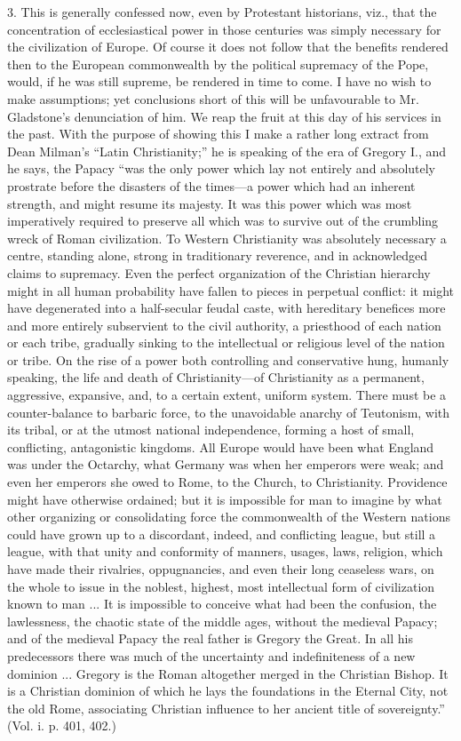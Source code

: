 3. This is generally confessed now, even by Protestant historians,
viz., that the concentration of ecclesiastical power in those centuries
was simply necessary for the civilization of Europe. Of course it does
not follow that the benefits rendered then to the European commonwealth
by the political supremacy of the Pope, would, if he was still supreme,
be rendered in time to come. I have no wish to make assumptions; yet
conclusions short of this will be unfavourable to Mr. Gladstone's
denunciation of him. We reap the fruit at this day of his services in
the past. With the purpose of showing this I make a rather long extract
from Dean Milman's ``Latin Christianity;'' he is speaking of the
era of Gregory I., and he says, the Papacy ``was the only power
which lay not entirely and absolutely prostrate before the disasters of
the times—a power which had an inherent strength, and might resume its
majesty. It was this power which was most imperatively required to
preserve all which was to survive out of the crumbling wreck of Roman
civilization. To Western Christianity was absolutely necessary a centre,
standing alone, strong in traditionary reverence, and in acknowledged
claims to supremacy. Even the perfect organization of the Christian
hierarchy might in all human probability have fallen to pieces in
perpetual conflict: it might have degenerated into a half-secular feudal
caste, with hereditary benefices more and more entirely subservient to
the civil authority, a priesthood of each nation or each tribe,
gradually sinking to the intellectual or religious level of the nation
or tribe. On the rise of a power both controlling and conservative hung,
humanly speaking, the life and death of Christianity—of Christianity
as a permanent, aggressive, expansive, and, to a certain extent, uniform
system. There must be a counter-balance to barbaric force, to the
unavoidable anarchy of Teutonism, with its tribal, or at the utmost
national independence, forming a host of small, conflicting,
antagonistic kingdoms. All Europe would have been what England was under
the Octarchy, what Germany was when her emperors were weak; and even her
emperors she owed to Rome, to the Church, to Christianity. Providence
might have otherwise ordained; but it is impossible for man to imagine
by what other organizing or consolidating force the commonwealth of the
Western nations could have grown up to a discordant, indeed, and
conflicting league, but still a league, with that unity and conformity
of manners, usages, laws, religion, which have made their rivalries,
oppugnancies, and even their long ceaseless wars, on the whole to
issue in the noblest, highest, most intellectual form of civilization
known to man ... It is impossible to conceive what had been the
confusion, the lawlessness, the chaotic state of the middle ages,
without the medieval Papacy; and of the medieval Papacy the real father
is Gregory the Great. In all his predecessors there was much of the
uncertainty and indefiniteness of a new dominion ... Gregory is the
Roman altogether merged in the Christian Bishop. It is a Christian
dominion of which he lays the foundations in the Eternal City, not the
old Rome, associating Christian influence to her ancient title of
sovereignty.'' (Vol. i. p. 401, 402.)

